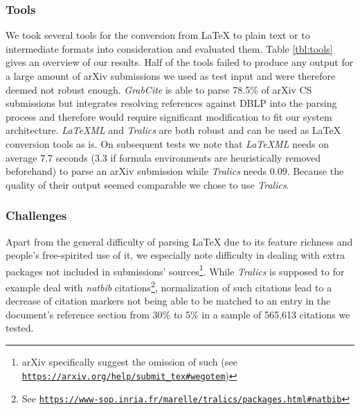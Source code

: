\subsubsection{Tools}
We took several tools for the conversion from \LaTeX{} to plain text or to intermediate formats into consideration and evaluated them. Table \ref{tbl:tools} gives an overview of our results. Half of the tools failed to produce any output for a large amount of arXiv submissions we used as test input and were therefore deemed not robust enough. \textit{GrabCite} is able to parse 78.5\% of arXiv CS submissions but integrates resolving references against DBLP into the parsing process and therefore would require significant modification to fit our system architecture. \textit{LaTeXML} and \textit{Tralics} are both robust and can be used as \LaTeX{} conversion tools as is. On subsequent tests we note that \textit{LaTeXML} needs on average 7.7 seconds (3.3 if formula environments are heuristically removed beforehand) to parse an arXiv submission while \textit{Tralics} needs 0.09. Because the quality of their output seemed comparable we chose to use \textit{Tralics}.


\subsubsection{Challenges}
Apart from the general difficulty of parsing \LaTeX{} due to its feature richness and people's free-spirited use of it, we especially note difficulty in dealing with extra packages not included in submissions' sources\footnote{arXiv specifically suggest the omission of such (see \texttt{\url{https://arxiv.org/help/submit\_tex\#wegotem}})}. While \textit{Tralics} is supposed to for example deal with \textit{natbib} citations\footnote{See \texttt{\url{https://www-sop.inria.fr/marelle/tralics/packages.html\#natbib}}}, normalization of such citations lead to a decrease of citation markers not being able to be matched to an entry in the document's reference section from 30\% to 5\% in a sample of 565,613 citations we tested.


